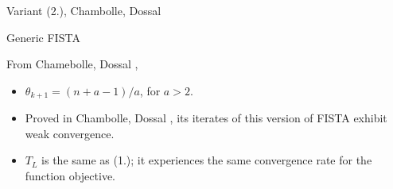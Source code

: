\documentclass[11pt]{beamer}
\theoremstyle{definition}
\begin{document}
    \begin{frame}{Variant (2.), Chambolle, Dossal}
        \begin{algorithm}[H]
            \begin{tiny}
                \begin{algorithmic}[1]
                    \ENDFOR
                \end{algorithmic}
                \caption{Generic FISTA}    
            \end{tiny}
        \end{algorithm}
        From Chamebolle, Dossal \cite{chambolle_convergence_2015}, 
        \begin{itemize}
            \item $\theta_{k + 1} = (n + a - 1)/a$, for $a > 2$. 
            \item Proved in Chambolle, Dossal \cite{chambolle_convergence_2015}, its iterates of this version of FISTA exhibit weak convergence. 
            \item $T_L$ is the same as (1.); it experiences the same convergence rate for the function objective. 
        \end{itemize}
    \end{frame}
\end{document}

